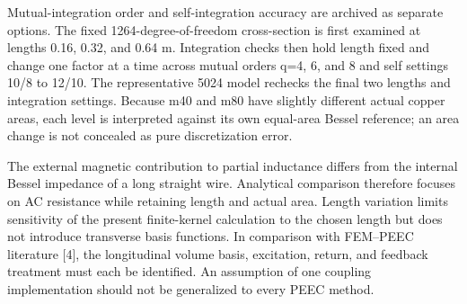 \documentclass[journal,10pt]{IEEEtran}
\begin{document}
Mutual-integration order and self-integration accuracy are archived as separate options. The fixed 1264-degree-of-freedom cross-section is first examined at lengths 0.16, 0.32, and 0.64 m. Integration checks then hold length fixed and change one factor at a time across mutual orders q=4, 6, and 8 and self settings 10/8 to 12/10. The representative 5024 model rechecks the final two lengths and integration settings. Because m40 and m80 have slightly different actual copper areas, each level is interpreted against its own equal-area Bessel reference; an area change is not concealed as pure discretization error.


The external magnetic contribution to partial inductance differs from the internal Bessel impedance of a long straight wire. Analytical comparison therefore focuses on AC resistance while retaining length and actual area. Length variation limits sensitivity of the present finite-kernel calculation to the chosen length but does not introduce transverse basis functions. In comparison with FEM–PEEC literature [4], the longitudinal volume basis, excitation, return, and feedback treatment must each be identified. An assumption of one coupling implementation should not be generalized to every PEEC method.
\end{document}

